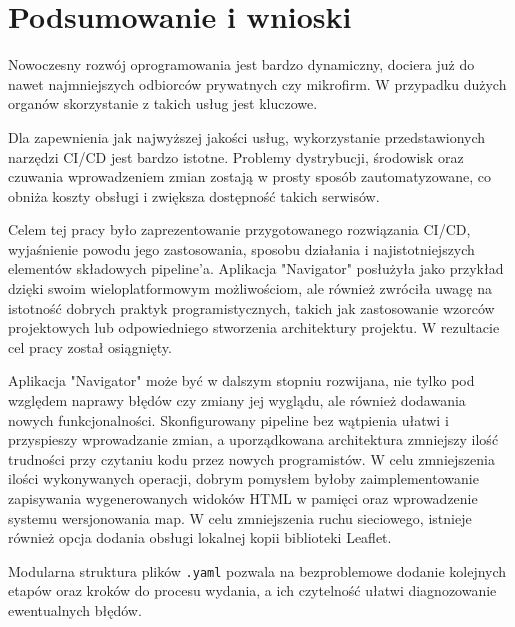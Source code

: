 \section{Podsumowanie i wnioski}
Nowoczesny rozwój oprogramowania jest bardzo dynamiczny, dociera już do nawet 
najmniejszych odbiorców prywatnych czy mikrofirm. W przypadku dużych organów 
skorzystanie z takich usług jest kluczowe.

Dla zapewnienia jak najwyższej jakości usług, wykorzystanie przedstawionych 
narzędzi CI/CD jest bardzo istotne. Problemy dystrybucji, środowisk oraz 
czuwania wprowadzeniem zmian zostają w prosty sposób zautomatyzowane, 
co obniża koszty obsługi i zwiększa dostępność takich serwisów.

Celem tej pracy było zaprezentowanie przygotowanego rozwiązania CI/CD, 
wyjaśnienie powodu jego zastosowania, sposobu działania i najistotniejszych 
elementów składowych pipeline'a. Aplikacja "Navigator" posłużyła jako 
przykład dzięki swoim wieloplatformowym możliwościom, ale również zwróciła 
uwagę na istotność dobrych praktyk programistycznych, takich jak zastosowanie 
wzorców projektowych lub odpowiedniego stworzenia architektury projektu.
W rezultacie cel pracy został osiągnięty.

Aplikacja "Navigator" może być w dalszym stopniu rozwijana, nie tylko pod 
względem naprawy błędów czy zmiany jej wyglądu, ale również dodawania 
nowych funkcjonalności. Skonfigurowany pipeline bez wątpienia ułatwi 
i przyspieszy wprowadzanie zmian, a uporządkowana architektura 
zmniejszy ilość trudności przy czytaniu kodu przez nowych programistów.
W celu zmniejszenia ilości wykonywanych operacji, dobrym pomysłem byłoby 
zaimplementowanie zapisywania wygenerowanych widoków HTML w pamięci 
oraz wprowadzenie systemu wersjonowania map.
W celu zmniejszenia ruchu sieciowego, istnieje również opcja 
dodania obsługi lokalnej kopii biblioteki Leaflet.

Modularna struktura plików \verb|.yaml| pozwala na bezproblemowe 
dodanie kolejnych etapów oraz kroków do procesu wydania, 
a ich czytelność ułatwi diagnozowanie ewentualnych błędów.
